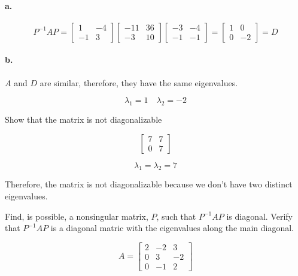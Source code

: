 \documentclass{report}
\begin{document}
\paragraph{a.} 

$$
P^{-1} AP = \begin{bmatrix} 1 & -4 \\ -1 & 3 \end{bmatrix} \begin{bmatrix} -11 & 36 \\ -3 & 10 \end{bmatrix} \begin{bmatrix} -3 & -4 \\ -1 & -1 \end{bmatrix} = \begin{bmatrix} 1 & 0 \\ 0 & -2 \end{bmatrix} = D
$$

\paragraph{b.} $A$ and $D$ are similar, therefore, they have the same eigenvalues.

$$
\lambda_1 = 1 \quad \lambda_2 = -2 
$$

\begin{tcolorbox}[colframe = lightred]
	Show that the matrix is not diagonalizable
	
	$$
	\begin{bmatrix} 7 & 7 \\ 0 & 7 \end{bmatrix} 
	$$
\end{tcolorbox}

$$
\lambda_1 = \lambda_2 = 7
$$

\noindent Therefore, the matrix is not diagonalizable because we don't have two distinct eigenvalues. 

\begin{tcolorbox}[colframe = lightred]
	Find, is possible, a nonsingular matrix, $P$, such that $P^{-1} AP$ is diagonal. Verify that $P^{-1} AP$ is a diagonal matric with the eigenvalues along the main diagonal.
	
	$$
	A = \begin{bmatrix} 2 & -2 & 3 \\ 0 & 3 & -2 \\ 0 & -1 & 2 \end{bmatrix}
	$$
\end{tcolorbox}
\end{document}
